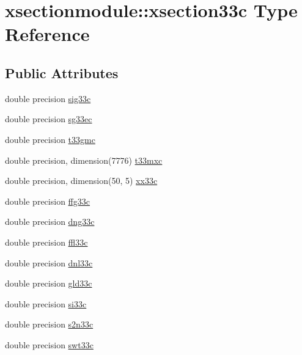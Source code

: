 \hypertarget{structxsectionmodule_1_1xsection33c}{}\section{xsectionmodule\+:\+:xsection33c Type Reference}
\label{structxsectionmodule_1_1xsection33c}
\subsection*{Public Attributes}
\begin{DoxyCompactItemize}
\item 
double precision \hyperlink{structxsectionmodule_1_1xsection33c_a56bc1a93d65f9fc0fdfe9bb1575bfd07}{sig33c}
\item 
double precision \hyperlink{structxsectionmodule_1_1xsection33c_a47fd9b11dfc97eded90b9470c16e49bb}{sg33ec}
\item 
double precision \hyperlink{structxsectionmodule_1_1xsection33c_ad1c30bcbd51153cc439e1c14adb475af}{t33gmc}
\item 
double precision, dimension(7776) \hyperlink{structxsectionmodule_1_1xsection33c_aa96d3f34a1049cebe51c334e469cf2b0}{t33mxc}
\item 
double precision, dimension(50, 5) \hyperlink{structxsectionmodule_1_1xsection33c_a7263f4bb25b679159740e6baebaa32ff}{xx33c}
\item 
double precision \hyperlink{structxsectionmodule_1_1xsection33c_ab9867afec299ae5c3fcd763bd28bc452}{ffg33c}
\item 
double precision \hyperlink{structxsectionmodule_1_1xsection33c_a8d2ac3988d1c9012e7fddcb9c5e5c1e1}{dng33c}
\item 
double precision \hyperlink{structxsectionmodule_1_1xsection33c_aa8561ef6a51ca405ad78f3c3002c81f9}{ffl33c}
\item 
double precision \hyperlink{structxsectionmodule_1_1xsection33c_a8dc2531044aa0a8dd9c1410cadbb3a52}{dnl33c}
\item 
double precision \hyperlink{structxsectionmodule_1_1xsection33c_acbb4ea03114192cce83a55fa68b894df}{gld33c}
\item 
double precision \hyperlink{structxsectionmodule_1_1xsection33c_a6db056fce7110e21dd8e391185c18da5}{si33c}
\item 
double precision \hyperlink{structxsectionmodule_1_1xsection33c_a8bd16769821cfdb2a658823676292023}{s2n33c}
\item 
double precision \hyperlink{structxsectionmodule_1_1xsection33c_a9990c8b909426a831170bb31f6cc3c30}{swt33c}

\end{DoxyCompactItemize}
